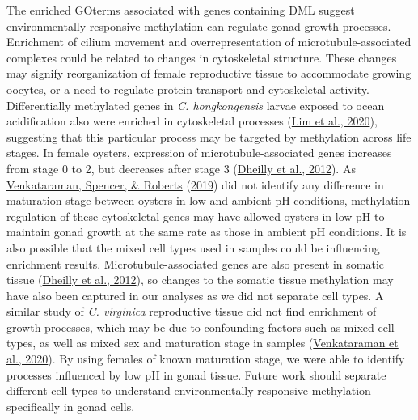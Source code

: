 \documentclass [11pt, proquest] {uwthesis}[2015/03/03]
\begin{document}
The enriched GOterms associated with genes containing DML suggest environmentally-responsive methylation can regulate gonad growth processes. Enrichment of cilium movement and overrepresentation of microtubule-associated complexes could be related to changes in cytoskeletal structure. These changes may signify reorganization of female reproductive tissue to accommodate growing oocytes, or a need to regulate protein transport and cytoskeletal activity. Differentially methylated genes in \emph{C. hongkongensis} larvae exposed to ocean acidification also were enriched in cytoskeletal processes (\protect\hyperlink{ref-Lim2020}{Lim et al., 2020}), suggesting that this particular process may be targeted by methylation across life stages. In female oysters, expression of microtubule-associated genes increases from stage 0 to 2, but decreases after stage 3 (\protect\hyperlink{ref-Dheilly2012}{Dheilly et al., 2012}). As \protect\hyperlink{ref-Venkataraman2019}{Venkataraman, Spencer, \& Roberts} (\protect\hyperlink{ref-Venkataraman2019}{2019}) did not identify any difference in maturation stage between oysters in low and ambient pH conditions, methylation regulation of these cytoskeletal genes may have allowed oysters in low pH to maintain gonad growth at the same rate as those in ambient pH conditions. It is also possible that the mixed cell types used in samples could be influencing enrichment results. Microtubule-associated genes are also present in somatic tissue (\protect\hyperlink{ref-Dheilly2012}{Dheilly et al., 2012}), so changes to the somatic tissue methylation may have also been captured in our analyses as we did not separate cell types. A similar study of \emph{C. virginica} reproductive tissue did not find enrichment of growth processes, which may be due to confounding factors such as mixed cell types, as well as mixed sex and maturation stage in samples (\protect\hyperlink{ref-Venkataraman2020}{Venkataraman et al., 2020}). By using females of known maturation stage, we were able to identify processes influenced by low pH in gonad tissue. Future work should separate different cell types to understand environmentally-responsive methylation specifically in gonad cells.
\end{document}
